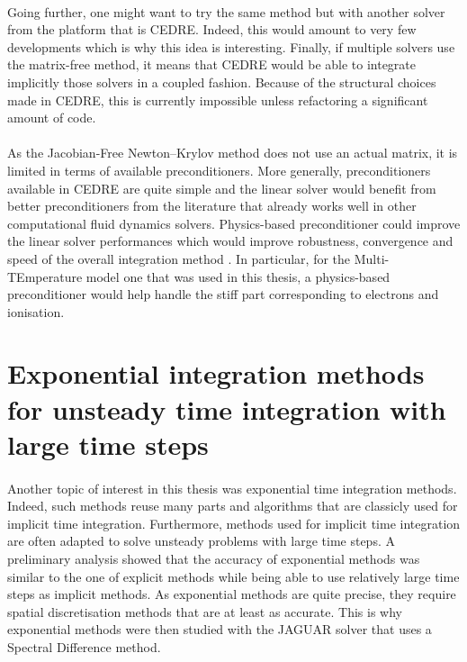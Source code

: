     \paragraph{}
    Going further, one might want to try the same method but with another solver from the platform that is CEDRE.
    Indeed, this would amount to very few developments which is why this idea is interesting.
    Finally, if multiple solvers use the matrix-free method, it means that CEDRE would be able to integrate implicitly those solvers in a coupled fashion.
    Because of the structural choices made in CEDRE, this is currently impossible unless refactoring a significant amount of code.

    \paragraph{}
    As the Jacobian-Free Newton--Krylov method does not use an actual matrix, it is limited in terms of available preconditioners.
    More generally, preconditioners available in CEDRE are quite simple and the linear solver would benefit from better preconditioners from the literature that already works well in other computational fluid dynamics solvers.
    Physics-based preconditioner could improve the linear solver performances which would improve robustness, convergence and speed of the overall integration method \cite{ParkNourgalievMartineauEtAl2009, LiuZhangZhongEtAl2015}.
    In particular, for the Multi-TEmperature model one that was used in this thesis, a physics-based preconditioner would help handle the stiff part corresponding to electrons and ionisation.


  \section*{Exponential integration methods for unsteady time integration with large time steps}

    \paragraph{}
    Another topic of interest in this thesis was exponential time integration methods.
    Indeed, such methods reuse many parts and algorithms that are classicly used for implicit time integration.
    Furthermore, methods used for implicit time integration are often adapted to solve unsteady problems with large time steps.
    A preliminary analysis showed that the accuracy of exponential methods was similar to the one of explicit methods while being able to use relatively large time steps as implicit methods.
    As exponential methods are quite precise, they require spatial discretisation methods that are at least as accurate.
    This is why exponential methods were then studied with the JAGUAR solver that uses a Spectral Difference method.

